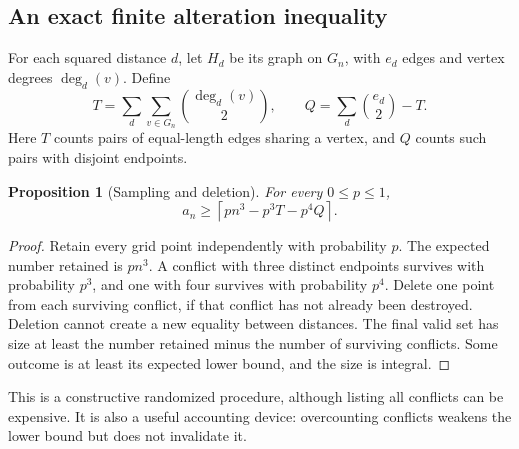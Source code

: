 \documentclass[11pt,letterpaper]{article}
\newtheorem{proposition}[theorem]{Proposition}
\theoremstyle{definition}
\newcommand{\ceil}[1]{\left\lceil #1\right\rceil}
\begin{document}
\subsection{An exact finite alteration inequality}
For each squared distance \(d\), let \(H_d\) be its graph on \(G_n\),
with \(e_d\) edges and vertex degrees \(\deg_d(v)\). Define
\[
 T=\sum_d\sum_{v\in G_n}\binom{\deg_d(v)}2,\qquad
 Q=\sum_d\binom{e_d}2-T.
\]
Here \(T\) counts pairs of equal-length edges sharing a vertex, and
\(Q\) counts such pairs with disjoint endpoints.

\begin{proposition}[Sampling and deletion]
\label{prop:alteration}
For every \(0\le p\le1\),
\[
 a_n\ge
 \ceil{p n^3-p^3T-p^4Q}.
\]
\end{proposition}
\begin{proof}
Retain every grid point independently with probability \(p\).
The expected number retained is \(pn^3\). A conflict with three
distinct endpoints survives with probability \(p^3\), and one with
four survives with probability \(p^4\). Delete one point from each
surviving conflict, if that conflict has not already been destroyed.
Deletion cannot create a new equality between distances.
The final valid set has size at least the number retained minus the
number of surviving conflicts. Some outcome is at least its expected
lower bound, and the size is integral.
\end{proof}

This is a constructive randomized procedure, although listing all
conflicts can be expensive. It is also a useful accounting device:
overcounting conflicts weakens the lower bound but does not invalidate it.
\end{document}
